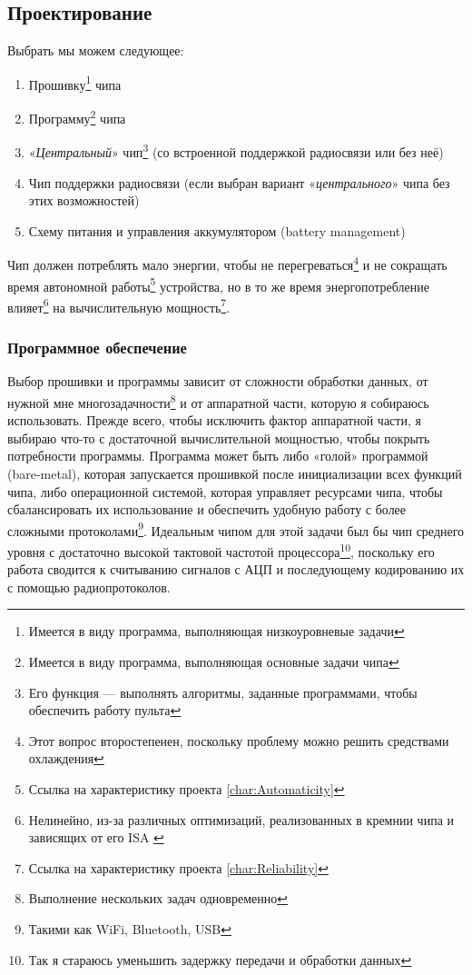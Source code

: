 \documentclass[a4paper, 10pt, final]{article} %
\newcommand{\parenciteit}[2]{\textit{\parencite[#1]{#2}}} %
\begin{document}
    \begin{samepage}
        \subsection{Проектирование}\label{sec:MotherboardDesign}
        \noindent Выбрать мы можем следующее:
        \begin{enumerate}[label=\emph{(\arabic*)}]
            \item Прошивку\footnote{Имеется в виду программа, выполняющая низкоуровневые задачи} чипа
            \item Программу\footnote{Имеется в виду программа, выполняющая основные задачи чипа} чипа
            \item «\emph{Центральный}» чип\footnote{Его функция --- выполнять алгоритмы, заданные программами, чтобы обеспечить работу пульта} (со встроенной поддержкой радиосвязи или без неё)
            \item Чип поддержки радиосвязи (если выбран вариант «\emph{центрального}» чипа без этих возможностей)
            \item Схему питания и управления аккумулятором (battery management)
        \end{enumerate}
    \end{samepage}

    Чип должен потреблять мало энергии, чтобы не перегреваться\footnote{Этот вопрос второстепенен, поскольку проблему можно решить средствами охлаждения} и не сокращать время автономной работы\footnote{Ссылка на характеристику проекта \ref{char:Automaticity}} устройства, но в то же время энергопотребление влияет\footnote{Нелинейно, из-за различных оптимизаций, реализованных в кремнии чипа и зависящих от его ISA \parenciteit{}{ISA:Wiki}} на вычислительную мощность\footnote{Ссылка на характеристику проекта \ref{char:Reliability}}.

    \subsubsection{Программное обеспечение}\label{sec:MotherboardDesignSoftware}
    Выбор прошивки и программы зависит от сложности обработки данных, от нужной мне многозадачности\footnote{Выполнение нескольких задач одновременно} и от аппаратной части, которую я собираюсь использовать.
    Прежде всего, чтобы исключить фактор аппаратной части, я выбираю что-то с достаточной вычислительной мощностью, чтобы покрыть потребности программы.
    Программа может быть либо «голой» программой (bare-metal), которая запускается прошивкой после инициализации всех функций чипа, либо операционной системой, которая управляет ресурсами чипа, чтобы сбалансировать их использование и обеспечить удобную работу с более сложными протоколами\footnote{Такими как WiFi, Bluetooth, USB}.
    Идеальным чипом для этой задачи был бы чип среднего уровня с достаточно высокой тактовой частотой процессора\footnote{Так я стараюсь уменьшить задержку передачи и обработки данных}, поскольку его работа сводится к считыванию сигналов с АЦП и последующему кодированию их с помощью радиопротоколов.
\end{document}
